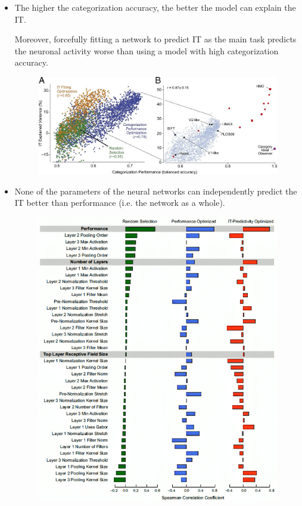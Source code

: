 \begin{casestudy}
\begin{descriptionlist}
\begin{itemize}
                \item The higher the categorization accuracy, the better the model can explain the IT.
                    
                    Moreover, forcefully fitting a network to predict IT as the main task 
                    predicts the neuronal activity worse than using a model with high categorization accuracy.

                    \begin{figure}[H]
                        \centering
                        \includegraphics[width=0.7\linewidth]{./img/vision_nn_neural_prediction.png}
                    \end{figure}

                \item None of the parameters of the neural networks can independently predict the IT better than performance (i.e. the network as a whole).
                    \begin{figure}[H]
                        \centering
                        \includegraphics[width=0.5\linewidth]{./img/vision_nn_params_prediction.png}
                    \end{figure}


\end{itemize}
\end{descriptionlist}
\end{casestudy}
